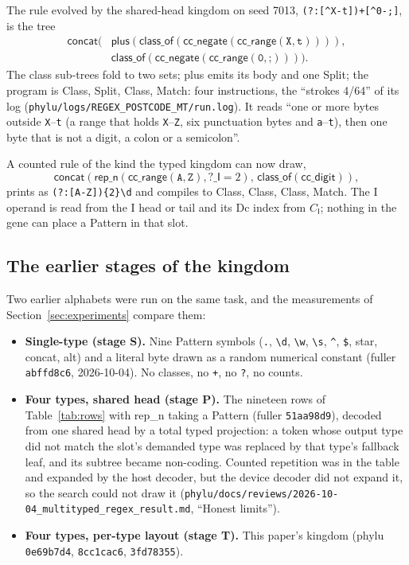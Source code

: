 \documentclass[sigconf,nonacm]{acmart}
\newcommand{\rx}{\lstinline[style=mono]}
\newcommand{\ty}[1]{\textsf{#1}}
\newcommand{\sym}[1]{\textsf{#1}}
\newcommand{\src}[1]{{\small\nolinkurl{#1}}}
\begin{document}
The rule evolved by the shared-head kingdom on seed 7013,
\rx!(?:[^X-t])+[^0-;]!, is the tree
\begin{align*}
\sym{concat}\big(&\sym{plus}(\sym{class\_of}(\sym{cc\_negate}(\sym{cc\_range}(\texttt{X},\texttt{t})))),\\
&\sym{class\_of}(\sym{cc\_negate}(\sym{cc\_range}(\texttt{0},\texttt{;})))\big).
\end{align*}
The class sub-trees fold to two sets; \sym{plus} emits its body and one
\textsf{Split}; the program is \textsf{Class}, \textsf{Split},
\textsf{Class}, \textsf{Match}: four instructions, the ``strokes 4/64'' of its
log (\src{phylu/logs/REGEX_POSTCODE_MT/run.log}). It reads ``one or more bytes
outside \texttt{X}--\texttt{t} (a range that holds \texttt{X}--\texttt{Z},
six punctuation bytes and \texttt{a}--\texttt{t}), then one byte that is not a
digit, a colon or a semicolon''.

A counted rule of the kind the typed kingdom can now draw,
\[
\sym{concat}(\sym{rep\_n}(\sym{cc\_range}(\texttt{A},\texttt{Z}),\sym{?\_I}{=}2),\,
\sym{class\_of}(\sym{cc\_digit})),
\]
prints as \rx!(?:[A-Z]){2}\d! and compiles to
\textsf{Class}, \textsf{Class}, \textsf{Class}, \textsf{Match}. The \ty{I}
operand is read from the \ty{I} head or tail and its Dc index from $C_{\ty{I}}$;
nothing in the gene can place a \ty{Pattern} in that slot.

\subsection{The earlier stages of the kingdom}

Two earlier alphabets were run on the same task, and the measurements of
Section~\ref{sec:experiments} compare them:

\begin{itemize}
\item \textbf{Single-type (stage S).} Nine \ty{Pattern} symbols (\rx!.!, \rx!\d!,
\rx!\w!, \rx!\s!, \rx!^!, \rx!$!, \sym{star}, \sym{concat}, \sym{alt}) and a
literal byte drawn as a random numerical constant (fuller \texttt{abffd8c6},
2026-10-04). No classes, no \rx!+!, no \rx!?!, no counts.
\item \textbf{Four types, shared head (stage P).} The nineteen rows of
Table~\ref{tab:rows} with \sym{rep\_n} taking a \ty{Pattern} (fuller
\texttt{51aa98d9}), decoded from one shared head by a total typed projection: a
token whose output type did not match the slot's demanded type was replaced by
that type's fallback leaf, and its subtree became non-coding. Counted repetition
was in the table and expanded by the host decoder, but the device decoder did
not expand it, so the search could not draw it
(\src{phylu/docs/reviews/2026-10-04_multityped_regex_result.md}, ``Honest
limits'').
\item \textbf{Four types, per-type layout (stage T).} This paper's kingdom
(phylu \texttt{0e69b7d4}, \texttt{8cc1cac6}, \texttt{3fd78355}).
\end{itemize}
\end{document}
